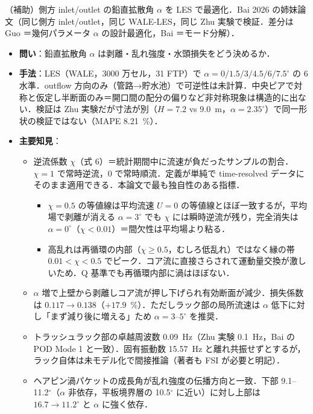 \documentclass[11pt]{jsarticle}
\newcommand{\litref}[1]{{\large\bfseries\color{citecolor}#1}}
\begin{document}
  

\noindent\litref{Guo et al. (2024)}\quad（補助）側方 inlet/outlet の鉛直拡散角 $\alpha$ を LES で最適化．Bai 2026 の姉妹論文（同じ側方 inlet/outlet，同じ WALE-LES，同じ Zhu 実験で検証．差分は Guo ＝幾何パラメータ $\alpha$ の設計最適化，Bai ＝モード分解）．
\begin{itemize}
  \item \textbf{問い}：鉛直拡散角 $\alpha$ は剥離・乱れ強度・水頭損失をどう決めるか．
  \item \textbf{手法}：LES（WALE，3000 万セル，31 FTP）で $\alpha = 0/1.5/3/4.5/6/7.5^\circ$ の 6 水準．outflow 方向のみ（管路→貯水池）で可逆性は未計算．中央ピアで対称と仮定し半断面のみ＝開口間の配分の偏りなど非対称現象は構造的に出ない．検証は Zhu 実験だが寸法が別（$H = 7.2$ vs $9.0$~m，$\alpha = 2.35^\circ$）で同一形状の検証ではない（MAPE 8.21~\%）．
  \item \textbf{主要知見}：
  \begin{itemize}
    \item 逆流係数 $\chi$（式 6）＝統計期間中に流速が負だったサンプルの割合．$\chi = 1$ で常時逆流，0 で常時順流．定義が単純で time-resolved データにそのまま適用できる．本論文で最も独自性のある指標．
    \begin{itemize}
      \item $\chi = 0.5$ の等値線は平均流速 $U = 0$ の等値線とほぼ一致するが，平均場で剥離が消える $\alpha = 3^\circ$ でも $\chi$ には瞬時逆流が残り，完全消失は $\alpha = 0^\circ$（$\chi < 0.01$）＝間欠性は平均場より粘る．
      \item 高乱れは再循環の内部（$\chi \geq 0.5$，むしろ低乱れ）ではなく縁の帯 $0.01 < \chi < 0.5$ でピーク．コア流に直接さらされて運動量交換が激しいため．Q 基準でも再循環内部に渦はほぼない．
    \end{itemize}
    \item $\alpha$ 増で上壁から剥離しコア流が押し下げられ有効断面が減少．損失係数は $0.117 \to 0.138$（$+17.9$~\%）．ただしラック部の局所流速は $\alpha$ 低下に対し「まず減り後に増える」ため $\alpha = 3$--$5^\circ$ を推奨．
    \item トラッシュラック部の卓越周波数 0.09~Hz（Zhu 実験 0.1~Hz，Bai の POD Mode 1 と一致）．固有振動数 15.57~Hz と離れ共振せずとするが，ラック自体は未モデル化で間接推論（著者も FSI が必要と明記）．
    \item ヘアピン渦パケットの成長角が乱れ強度の伝播方向と一致．下部 9.1--11.2$^\circ$（$\alpha$ 非依存，平板境界層の 10.5$^\circ$ に近い）に対し上部は $16.7 \to 11.2^\circ$ と $\alpha$ に強く依存．

\end{itemize}
\end{itemize}
\end{document}
